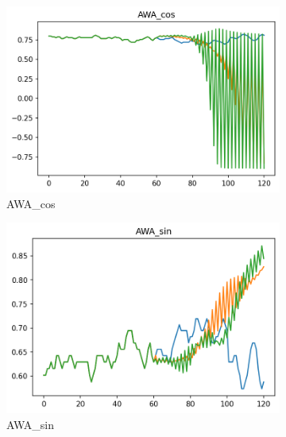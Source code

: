 \documentclass[12pt,twoside]{report}
\begin{document}
\begin{figure}[h]
     \centering
     \begin{subfigure}[b]{0.32\textwidth}
         \centering
         \includegraphics[width=\textwidth]{figures/prediction-plots-joint/AWA_cos.png}
         \caption{AWA\_cos}
     \end{subfigure}
     \begin{subfigure}[b]{0.32\textwidth}
         \centering
         \includegraphics[width=\textwidth]{figures/prediction-plots-joint/AWA_sin.png}
         \caption{AWA\_sin}
     \end{subfigure}
     \begin{subfigure}[b]{0.32\textwidth}
         \centering

\end{subfigure}
\end{figure}
\end{document}
